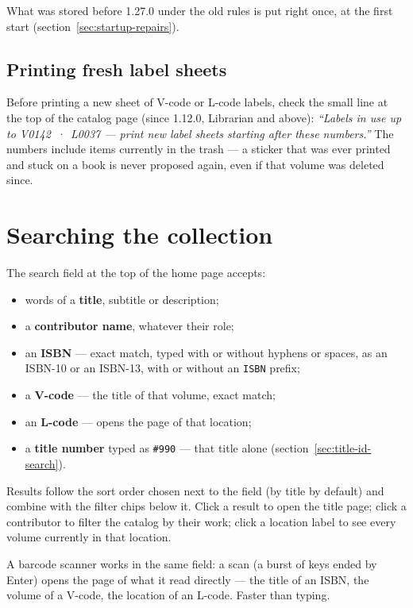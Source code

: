 What was stored before 1.27.0 under the old rules is put right once,
at the first start (section~\ref{sec:startup-repairs}).

\subsection*{Printing fresh label sheets}

Before printing a new sheet of V-code or L-code labels, check the
small line at the top of the catalog page (since 1.12.0, Librarian
and above): \emph{``Labels in use up to V0142~·~L0037 --- print new
label sheets starting after these numbers.''} The numbers include
items currently in the trash — a sticker that was ever printed and
stuck on a book is never proposed again, even if that volume was
deleted since.

\section{Searching the collection}\label{sec:search}

The search field at the top of the home page accepts:

\begin{itemize}
  \item words of a \textbf{title}, subtitle or description;
  \item a \textbf{contributor name}, whatever their role;
  \item an \textbf{ISBN} --- exact match, typed with or without hyphens
        or spaces, as an ISBN-10 or an ISBN-13, with or without an
        \texttt{ISBN} prefix;
  \item a \textbf{V-code} --- the title of that volume, exact match;
  \item an \textbf{L-code} --- opens the page of that location;
  \item a \textbf{title number} typed as \texttt{\#990} --- that title
        alone (section~\ref{sec:title-id-search}).
\end{itemize}

Results follow the sort order chosen next to the field (by title by
default) and combine with the filter chips below it. Click a result to
open the title page; click a contributor to filter the catalog by their
work; click a location label to see every volume currently in that
location.

\begin{tip}
A barcode scanner works in the same field: a scan (a burst of keys
ended by Enter) opens the page of what it read directly --- the title
of an ISBN, the volume of a V-code, the location of an L-code. Faster
than typing.
\end{tip}

